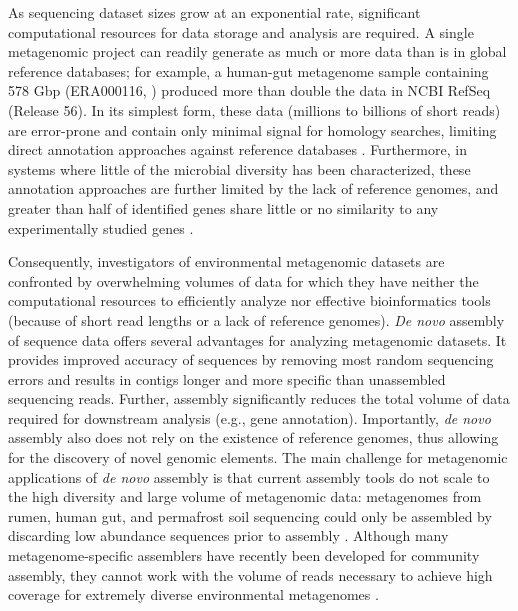 \documentclass{pnastwo}
\begin{document}
\begin{article}
As sequencing dataset sizes grow at an exponential
rate, significant computational resources for data storage and
analysis are required. A single metagenomic project can readily generate as much or more data
than is in global reference databases; for example, a human-gut metagenome sample
containing 578 Gbp (ERA000116, \cite{Qin:2010p189}) produced more than double the data in NCBI
RefSeq (Release 56).  In its simplest form, these data (millions to billions of short reads) are error-prone and contain only minimal signal for
homology searches, limiting direct annotation approaches
against reference databases \cite{Wommack:rlm}.  Furthermore, in systems where little of the microbial diversity has been characterized, 
these annotation approaches are further limited by the lack of reference genomes, and greater than half of identified genes share little or no similarity to any experimentally studied genes \cite{Arumugam:2011p735,Qin:2010p189}.  

Consequently, investigators of environmental metagenomic datasets are confronted by
overwhelming volumes of data for which they have neither the computational resources
to efficiently analyze nor effective bioinformatics tools (because of short read lengths or a lack of reference
genomes). \emph{De novo} assembly of sequence data offers several advantages for
analyzing metagenomic datasets. It provides improved accuracy of sequences by
removing most random sequencing errors and results in contigs longer and more
specific than unassembled sequencing reads. Further, assembly significantly
reduces the total volume of data required for downstream analysis (e.g., gene
annotation). Importantly, \emph{de novo} assembly also does not rely on the
existence of reference genomes, thus allowing for the discovery of novel genomic
elements. The main challenge for metagenomic applications of \emph{de novo}
assembly is that current assembly tools do not scale to the high diversity and
large volume of metagenomic data: metagenomes from rumen, human gut, and
permafrost soil sequencing could only be assembled by discarding low abundance
sequences prior to assembly
\cite{Hess:2011p686,Mackelprang:2011p1087,Qin:2010p189}. Although many
metagenome-specific assemblers have recently been developed for community
assembly, they cannot work with the volume of reads necessary to achieve high
coverage for extremely diverse environmental metagenomes
\cite{metaray, Scholz:2012p1372}.


\end{article}
\end{document}
